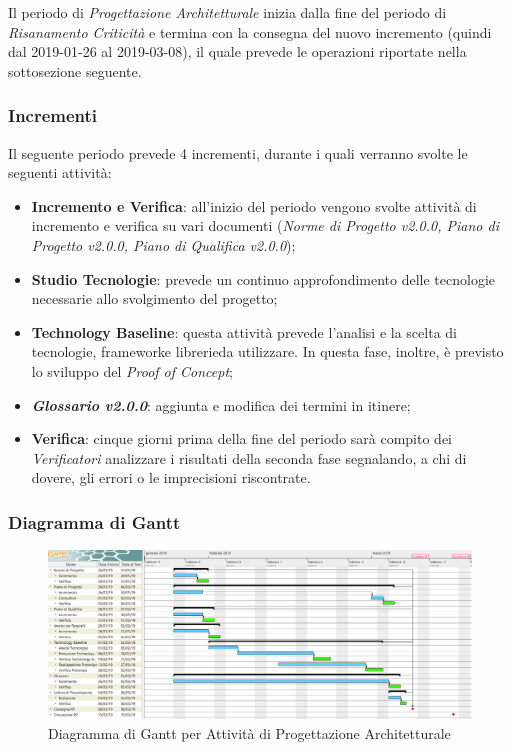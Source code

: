 Il periodo di \textit{Progettazione Architetturale} inizia dalla fine del periodo di \textit{Risanamento Criticità} e termina con la consegna del nuovo incremento (quindi dal 2019-01-26 al 2019-03-08), il quale prevede le operazioni riportate nella sottosezione seguente.

\subsubsection{Incrementi}

Il seguente periodo prevede 4 incrementi, durante i quali verranno svolte le seguenti attività:

\begin{itemize}
	\item \textbf{Incremento e Verifica}: all'inizio del periodo vengono svolte attività di incremento e verifica su vari documenti (\textit{Norme di Progetto v2.0.0, Piano di Progetto v2.0.0, Piano di Qualifica v2.0.0});
	\item \textbf{Studio Tecnologie}: prevede un continuo approfondimento delle tecnologie necessarie allo svolgimento del progetto; 
	\item \textbf{Technology Baseline}\glossario: questa attività prevede l'analisi e la scelta di tecnologie, framework\glossario e librerie\glossario da utilizzare. In questa fase, inoltre, è previsto lo sviluppo del \textit{Proof of Concept}\glossario;
	\item \textbf{\textit{Glossario v2.0.0}}: aggiunta e modifica dei termini in itinere;  
	\item \textbf{Verifica}\glossario: cinque giorni prima della fine del periodo sarà compito dei \textit{Verificatori} analizzare i risultati della seconda fase segnalando, a chi di dovere, gli errori o le imprecisioni riscontrate.
\end{itemize}

\begin{landscape}
\subsubsection{Diagramma di Gantt}
\begin{figure}[h]
	\centering
  		\includegraphics[width=1.0\linewidth]{./images/ProgettazioneArchitetturale.png}
  		\caption{Diagramma di Gantt per Attività di Progettazione Architetturale}
  		\label{fig:Gantt Progettazione Architetturale}
\end{figure}
\end{landscape}

